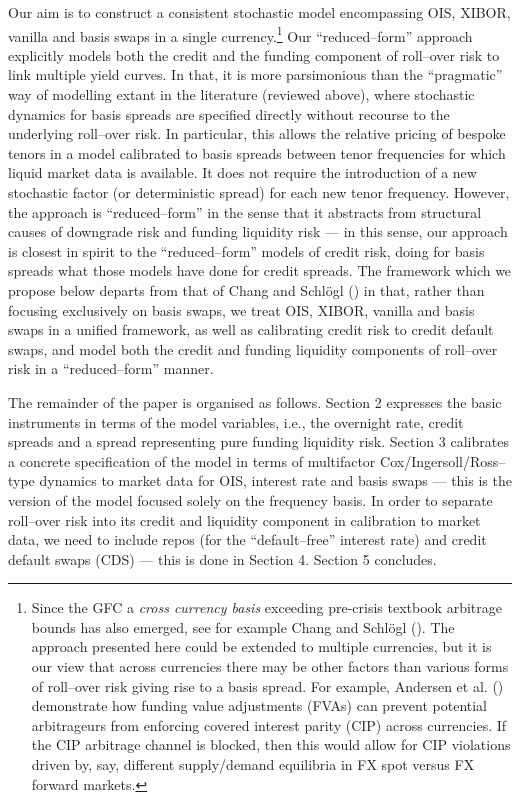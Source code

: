 \documentclass[12pt,a4paper]{article}
\theoremstyle{plain}
\numberwithin{equation}{section}
\begin{document}
Our aim is to construct a consistent stochastic model encompassing OIS, XIBOR, vanilla and basis swaps in a single currency.\footnote{Since the GFC a \emph{cross currency basis} exceeding pre-crisis textbook arbitrage bounds has also emerged, see for example Chang and Schl\"ogl (\citeyear*{ChaSch:2012}). The approach presented here could be extended to multiple currencies, but it is our view that across currencies there may be other factors than various forms of roll--over risk giving rise to a basis spread. For example, Andersen et al. (\citeyear*{OZ:And&Duf&Son:2017}) demonstrate how funding value adjustments (FVAs) can prevent potential arbitrageurs from enforcing covered interest parity (CIP) across currencies. If the CIP arbitrage channel is blocked, then this would allow for CIP violations driven by, say, different supply/demand equilibria in FX spot versus FX forward markets.} Our ``reduced--form'' approach explicitly models both the credit and the funding component of roll--over risk to link multiple yield curves. In that, it is more parsimonious than the ``pragmatic'' way of modelling extant in the literature (reviewed above), where stochastic dynamics for basis spreads are specified directly without recourse to the underlying roll--over risk. In particular, this allows the relative pricing of bespoke tenors in a model calibrated to basis spreads between tenor frequencies for which liquid market data is available. It does not require the introduction of a new stochastic factor (or deterministic spread) for each new tenor frequency. However, the approach is ``reduced--form'' in the sense that it abstracts from structural causes of downgrade risk and funding liquidity risk --- in this sense, our approach is closest in spirit to the ``reduced--form'' models of credit risk, doing for basis spreads what those models have done for credit spreads. The framework which we propose below departs from that of Chang and Schl\"ogl (\citeyear*{ChaSch:2015}) in that, rather than focusing exclusively on basis swaps, we treat OIS, XIBOR, vanilla and basis swaps in a unified framework, as well as calibrating credit risk to credit default swaps, and model both the credit and funding liquidity components of roll--over risk in a ``reduced--form'' manner.

The remainder of the paper is organised as follows. Section 2 expresses the basic instruments in terms of the model variables, i.e., the overnight rate, credit spreads and a spread representing pure funding liquidity risk. Section 3 calibrates a concrete specification of the model in terms of multifactor Cox/Ingersoll/Ross--type dynamics to market data for OIS, interest rate and basis swaps --- this is the version of the model focused solely on the frequency basis. In order to separate roll--over risk into its credit and liquidity component in calibration to market data, we need to include repos (for the ``default--free'' interest rate) and credit default swaps (CDS) --- this is done in Section 4. Section 5 concludes.
\end{document}
